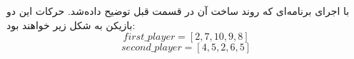 \documentclass[]{article}
\begin{document}
با اجرای برنامه‌ای که روند ساخت آن‌ در قسمت قبل توضیح داده‌شد. حرکات این دو بازیکن به شکل زیر خواهند بود:
$$first\_player = [2, 7, 10, 9, 8]$$
$$second\_player = [4, 5, 2, 6, 5]$$
\end{document}
